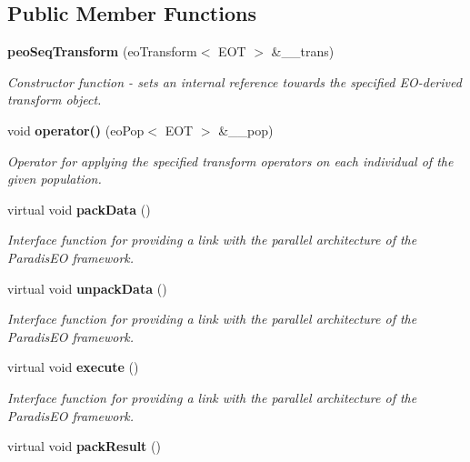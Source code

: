 \subsection*{Public Member Functions}
\begin{CompactItemize}
\item 
{\bf peo\-Seq\-Transform} (eo\-Transform$<$ EOT $>$ \&\_\-\_\-trans)
\begin{CompactList}\small\item\em Constructor function - sets an internal reference towards the specified EO-derived transform object. \item\end{CompactList}\item 
void {\bf operator()} (eo\-Pop$<$ EOT $>$ \&\_\-\_\-pop)
\begin{CompactList}\small\item\em Operator for applying the specified transform operators on each individual of the given population. \item\end{CompactList}\item 
virtual void {\bf pack\-Data} ()\label{classpeo_seq_transform_c4bf2724e9f6055f12bd169fad893be3}

\begin{CompactList}\small\item\em Interface function for providing a link with the parallel architecture of the Paradis\-EO framework. \item\end{CompactList}\item 
virtual void {\bf unpack\-Data} ()\label{classpeo_seq_transform_24e6cf15ef230ed538031b522ddd4ae6}

\begin{CompactList}\small\item\em Interface function for providing a link with the parallel architecture of the Paradis\-EO framework. \item\end{CompactList}\item 
virtual void {\bf execute} ()\label{classpeo_seq_transform_0294a2f9d6b44ec74d22eaceccdffc2b}

\begin{CompactList}\small\item\em Interface function for providing a link with the parallel architecture of the Paradis\-EO framework. \item\end{CompactList}\item 
virtual void {\bf pack\-Result} ()\label{classpeo_seq_transform_4861c61f9e46d83964ea8a156a9a3ee0}


\end{CompactItemize}

